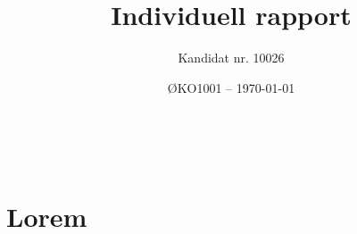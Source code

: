 \documentclass[a4paper, 12pt]{article}  %
\title{Individuell rapport}             %
\author{Kandidat nr. 10026}             %
\date{ØKO1001 -- \today}                %
\begin{document}
\maketitle
\emph{}\\[1em]
\tableofcontents %
\newpage

\section{Lorem}

\kant

\cite{refleks}

\newpage
\printbibliography[heading=bibintoc] %
\end{document}

